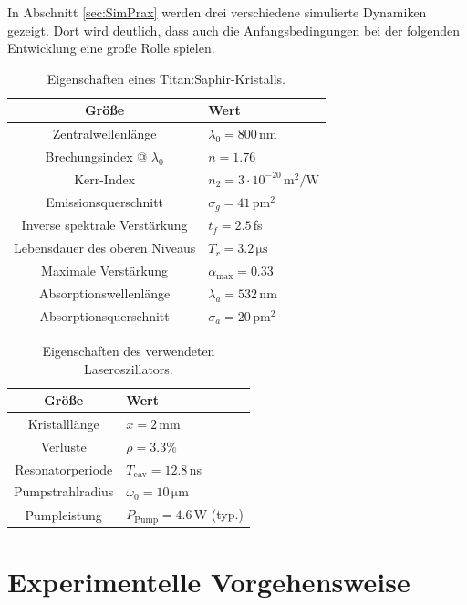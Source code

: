 \documentclass[bachelor,       %
               twoside,        %
               BCOR10mm,       %
               liststotoc,nomtotoc,bibtotoc, %
               english,ngerman, %
               final,          %
               ]{GAUBM}
\begin{document}
In Abschnitt \ref{sec:SimPrax} werden drei verschiedene simulierte Dynamiken gezeigt.
Dort wird deutlich, dass auch die Anfangsbedingungen bei der folgenden Entwicklung eine große Rolle spielen.

\begin{table}[!htb]
	\centering
	\begin{tabular}{|c|l|}
		\hline
		Größe & Wert\\
		\hline
		Zentralwellenlänge & $\lambda_0=800\,$nm\\	
		Brechungsindex @ $\lambda_0$ & $n=1.76$\\
		Kerr-Index & $n_2=3\cdot 10^{-20}\,\si{\meter^2\per\watt}$\\
		Emissionsquerschnitt & $\sigma_g=41\,\si{\pico\meter^2}$\\
		Inverse spektrale Verstärkung & $t_f=2.5\,$fs\\
		Lebensdauer des oberen Niveaus & $T_r=3.2\,\si{\micro\second}$\\
		Maximale Verstärkung & $\alpha_\text{max}=0.33$\\
		Absorptionswellenlänge & $\lambda_a=532\,$nm\\
		Absorptionsquerschnitt & $\sigma_a=20\,\si{\pico\meter^2}$\\
		\hline
	\end{tabular}
	\caption{Eigenschaften eines Titan:Saphir-Kristalls.}
	\label{tab:TiSaProp}
\end{table}

\begin{table}[!htb]
	\centering
	\begin{tabular}{|c|l|}
		\hline
		Größe & Wert\\
		\hline
		Kristalllänge & $x=2\,$mm\\
		Verluste & $\rho=3.3\%$\\
		Resonatorperiode & $T_\text{cav}=12.8\,$ns\\
		Pumpstrahlradius & $\omega_0=10\,\si{\micro\meter}$\\
		Pumpleistung & $P_\text{Pump}=4.6\,$W (typ.)\\
		\hline
	\end{tabular}
	\caption{Eigenschaften des verwendeten Laseroszillators.}
	\label{tab:RB_Prop}
\end{table}

\chapter{Experimentelle Vorgehensweise}
\end{document}
